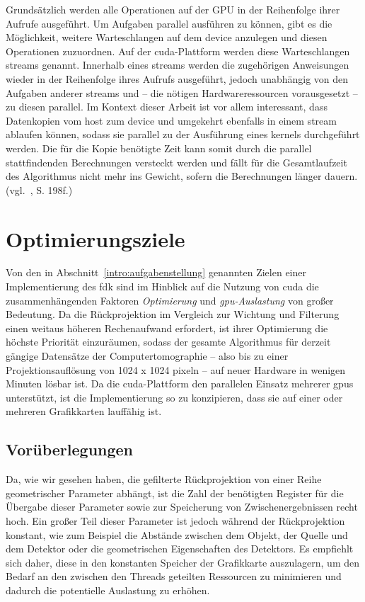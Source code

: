 Grundsätzlich werden alle Operationen auf der GPU in der Reihenfolge ihrer Aufrufe ausgeführt. Um Aufgaben parallel
ausführen zu können, gibt es die Möglichkeit, weitere Warteschlangen auf dem \gls{device} anzulegen und diesen
Operationen zuzuordnen. Auf der \gls{cuda}-Plattform werden diese Warteschlangen \glspl{stream} genannt. Innerhalb eines
\glspl{stream} werden die zugehörigen Anweisungen wieder in der Reihenfolge ihres Aufrufs ausgeführt, jedoch unabhängig
von den Aufgaben anderer \glspl{stream} und -- die nötigen Hardwareressourcen vorausgesetzt -- zu diesen parallel. Im
Kontext dieser Arbeit ist vor allem interessant, dass Datenkopien vom \gls{host} zum \gls{device} und umgekehrt
ebenfalls in einem \gls{stream} ablaufen können, sodass sie parallel zu der Ausführung eines \gls{kernel}s durchgeführt
werden. Die für die Kopie benötigte Zeit kann somit durch die parallel stattfindenden Berechnungen versteckt werden und
fällt für die Gesamtlaufzeit des Algorithmus nicht mehr ins Gewicht, sofern die Berechnungen länger dauern.
(vgl.~\cite{sandkand}, S. 198f.)

\section{Optimierungsziele}

Von den in Abschnitt~\ref{intro:aufgabenstellung} genannten Zielen einer Implementierung des \gls{fdk} sind im Hinblick
auf die Nutzung von \gls{cuda} die zusammenhängenden Faktoren \textit{Optimierung} und \textit{\gls{gpu}-Auslastung}
von großer Bedeutung. Da die Rückprojektion im Vergleich zur Wichtung und Filterung einen weitaus höheren Rechenaufwand
erfordert, ist ihrer Optimierung die höchste Priorität einzuräumen, sodass der gesamte Algorithmus für derzeit gängige
Datensätze der Computertomographie -- also bis zu einer Projektionsauflösung von 1024 x 1024 \gls{pixel}n -- auf neuer
Hardware in wenigen Minuten lösbar ist. Da die \gls{cuda}-Plattform den parallelen Einsatz mehrerer \gls{gpu}s
unterstützt, ist die Implementierung so zu konzipieren, dass sie auf einer oder mehreren Grafikkarten lauffähig ist.

\subsection{Vorüberlegungen}\label{ssec:opti_ueber}

Da, wie wir gesehen haben, die gefilterte Rückprojektion von einer Reihe geometrischer Parameter abhängt, ist die Zahl
der benötigten Register für die Übergabe dieser Parameter sowie zur Speicherung von Zwischenergebnissen recht hoch. Ein
großer Teil dieser Parameter ist jedoch während der Rückprojektion konstant, wie zum Beispiel die Abstände zwischen dem
Objekt, der Quelle und dem Detektor oder die geometrischen Eigenschaften des Detektors. Es empfiehlt sich daher, diese
in den konstanten Speicher der Grafikkarte auszulagern, um den Bedarf an den zwischen den Threads geteilten Ressourcen
zu minimieren und dadurch die potentielle Auslastung zu erhöhen.

